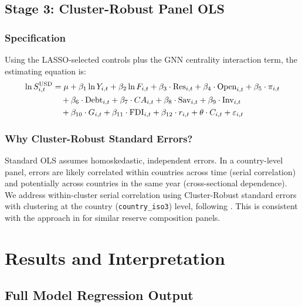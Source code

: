 \documentclass[12pt, letterpaper]{article}
\theoremstyle{definition}
\begin{document}
\subsection{Stage 3: Cluster-Robust Panel OLS}

\subsubsection{Specification}

Using the LASSO-selected controls plus the GNN centrality interaction term, the estimating equation is:
\begin{align}
\ln S_{i,t}^{\text{USD}} &= \mu + \beta_1 \ln Y_{i,t} + \beta_2 \ln F_{i,t} + \beta_3 \cdot \text{Res}_{i,t} + \beta_4 \cdot \text{Open}_{i,t} + \beta_5 \cdot \pi_{i,t} \notag\\
&\quad + \beta_6 \cdot \text{Debt}_{i,t} + \beta_7 \cdot CA_{i,t} + \beta_8 \cdot \text{Sav}_{i,t} + \beta_9 \cdot \text{Inv}_{i,t} \notag\\
&\quad + \beta_{10} \cdot G_{i,t} + \beta_{11} \cdot \text{FDI}_{i,t} + \beta_{12} \cdot r_{i,t} + \theta \cdot C_{i,t} + \varepsilon_{i,t}
\label{eq:panel_ols}
\end{align}

\subsubsection{Why Cluster-Robust Standard Errors?}

Standard OLS assumes homoskedastic, independent errors. In a country-level panel, errors are likely correlated within countries across time (serial correlation) and potentially across countries in the same year (cross-sectional dependence). We address within-cluster serial correlation using Cluster-Robust standard errors with clustering at the country (\texttt{country\_iso3}) level, following \citet{cameron2011robust}. This is consistent with the approach in \citet{eichengreen2022sanctions} for similar reserve composition panels.

\newpage
\section{Results and Interpretation}
\label{sec:results}

\subsection{Full Model Regression Output}
\end{document}
